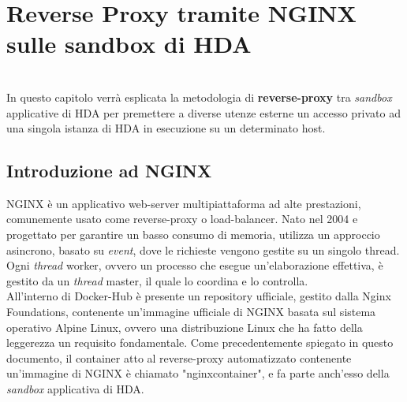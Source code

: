 
\chapter{Reverse Proxy tramite NGINX sulle sandbox di HDA}
\label{cap:nginx-reverse-proxy}
\\
In questo capitolo verrà esplicata la metodologia di \textbf{reverse-proxy} tra \textit{sandbox} applicative di HDA per premettere a diverse utenze esterne un accesso privato ad una singola istanza di HDA in esecuzione su un determinato host.

\section{Introduzione ad NGINX}
NGINX è un applicativo web-server multipiattaforma ad alte prestazioni, comunemente usato come reverse-proxy o load-balancer. Nato nel 2004 e progettato per garantire un basso consumo di memoria, utilizza un approccio asincrono, basato su \textit{event}, dove le richieste vengono gestite su un singolo thread. Ogni \textit{thread} worker, ovvero un processo che esegue un'elaborazione effettiva, è gestito da un \textit{thread} master, il quale lo coordina e lo controlla.\\
All'interno di Docker-Hub è presente un repository ufficiale, gestito dalla Nginx Foundations, contenente un'immagine ufficiale di NGINX basata sul sistema operativo Alpine Linux, ovvero una distribuzione Linux che ha fatto della leggerezza un requisito fondamentale. Come precedentemente spiegato in questo documento, il container atto al reverse-proxy automatizzato contenente un'immagine di NGINX è chiamato "nginxcontainer", e fa parte anch'esso della \textit{sandbox} applicativa di HDA.

